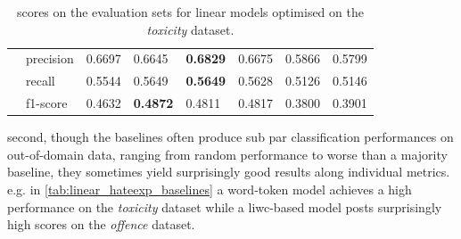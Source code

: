 \begin{table}[]
\begin{minipage}{0.42\paperheight}
{\begin{tabular}{ll|ll|ll|ll}
                                        & precision & 0.6697 & 0.6645            & \bf{0.6829} & 0.6675      & 0.5866 & 0.5799          \\
                                        & recall    & 0.5544 & 0.5649            & \bf{0.5649} & 0.5628      & 0.5126 & 0.5146          \\
                                        & f1-score  & 0.4632 & \bf{0.4872}       & 0.4811      & 0.4817      & 0.3800 & 0.3901
    \end{tabular}%
    }
    \caption{scores on the evaluation sets for linear models optimised on the \textit{toxicity} dataset.}
    \label{tab:linear_toxicity_baselines}
    \end{minipage}
\end{table}

second, though the baselines often produce sub par classification performances on out-of-domain data, ranging from random performance to worse than a majority baseline, they sometimes yield surprisingly good results along individual metrics.
e.g. in \cref{tab:linear_hateexp_baselines} a word-token model achieves a high performance on the \textit{toxicity} dataset while a liwc-based model posts surprisingly high scores on the \textit{offence} dataset.

